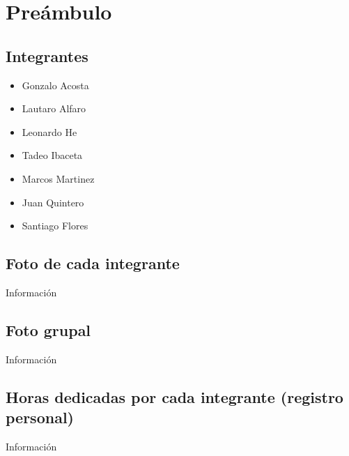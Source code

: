 \chapter{Preámbulo}
    \section{Integrantes}
    
        \begin{itemize}
            \item Gonzalo Acosta
            \item Lautaro Alfaro
            \item Leonardo He
            \item Tadeo Ibaceta
            \item Marcos Martinez
            \item Juan Quintero
            \item Santiago Flores
        \end{itemize}
                    
    
    \section{Foto de cada integrante}
    Información\par
    
    \section{Foto grupal}
    Información\\
    
    \section{Horas dedicadas por cada integrante (registro personal)}
    Información\\